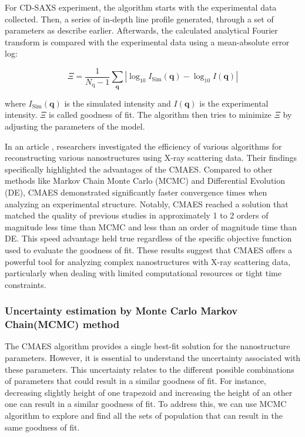 \FloatBarrier

\medskip

For CD-SAXS experiment, the algorithm starts with the experimental data collected. Then, a series of in-depth line profile generated, through a set of parameters as describe earlier. 
Afterwards, the calculated analytical Fourier transform is compared with the experimental data using a mean-absolute error log:

\medskip

\begin{equation}
    \Xi=\frac{1}{N_{\mathrm{q}}-1} \sum_{\mathbf{q}}\left|\log _{10} I_{\mathrm{Sim}}(\mathbf{q})-\log _{10} I(\mathbf{q})\right|
\end{equation}

\medskip

where $I_{\mathrm{Sim}}(\mathbf{q})$ is the simulated intensity and $I(\mathbf{q})$ is the experimental intensity.
$\Xi$ is called goodness of fit. The algorithm then tries to minimize $\Xi$ by adjusting the parameters of the model.

\medskip

In an article \cite{hannon2016advancing}, researchers investigated the efficiency of various algorithms
for reconstructing various nanostructures using X-ray scattering data.
Their findings specifically highlighted the advantages of the CMAES. Compared to other
methods like Markov Chain Monte Carlo (MCMC) and Differential Evolution 
(DE), CMAES demonstrated significantly faster convergence times when 
analyzing an experimental structure. Notably, CMAES reached a solution 
that matched the quality of previous studies in approximately 1 to 2 
orders of magnitude less time than MCMC and less than an order of 
magnitude time than DE. This speed advantage held true regardless 
of the specific objective function used to evaluate the goodness of fit. 
These results suggest that CMAES offers a powerful tool for analyzing 
complex nanostructures with X-ray scattering data, particularly when 
dealing with limited computational resources or tight time constraints.

\subsubsection{Uncertainty estimation by Monte Carlo Markov Chain(MCMC) method}\label{sec:mcmc_cdsaxs}

The CMAES algorithm provides a single best-fit solution for the nanostructure parameters. However, it is essential to understand the uncertainty associated with these parameters.
This uncertainty relates to the different possible combinations of parameters that could result in a similar goodness of fit. 
For instance, decreasing slightly height of one trapezoid and increasing the height of an other one can result in a similar goodness of fit.
To address this, we can use MCMC algorithm to explore and find all the sets of population that can result in the same goodness of fit.

